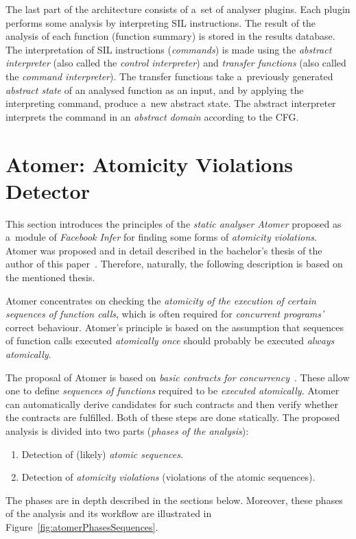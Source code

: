 \documentclass{ExcelAtFIT}
\theoremstyle{definition}
\begin{document}
The last part of the architecture consists of a~set of analyser plugins. Each plugin performs some analysis by interpreting SIL instructions. The result of the analysis of each function (function summary) is stored in the results database. The interpretation of SIL instructions (\emph{commands}) is made using the \emph{abstract interpreter} (also called the \emph{control interpreter}) and \emph{transfer functions} (also called the \emph{command interpreter}). The transfer functions take a~previously generated \emph{abstract state} of an analysed function as an input, and by applying the interpreting command, produce a~new abstract state. The abstract interpreter interprets the command in an \emph{abstract domain} according to the CFG.


\section{\hspace{-.15em}Atomer: Atomicity Violations Detector}
\label{sec:atomer}

This section introduces the principles of the \emph{static analyser Atomer} proposed as a~module of \emph{Facebook Infer} for finding some forms of \emph{atomicity violations}. Atomer was proposed and in detail described in the bachelor's thesis of the author of this paper~\cite{harmimBP}. Therefore, naturally, the following description is based on the mentioned thesis.

Atomer concentrates on checking the \emph{atomicity of the execution of certain sequences of function calls}, which is often required for \emph{concurrent programs'} correct behaviour. Atomer's principle is based on the assumption that sequences of function calls executed \emph{atomically once} should probably be executed \emph{always atomically}.

The proposal of Atomer is based on \emph{basic contracts for concurrency}~\cite{harmimBP, contracts2017}. These allow one to define \emph{sequences of functions} required to be \emph{executed atomically}. Atomer can automatically derive candidates for such contracts and then verify whether the contracts are fulfilled. Both of these steps are done statically. The proposed analysis is divided into two parts (\emph{phases of the analysis}):
\begin{enumerate}[label={\textbf{Phase~\arabic*}:}, leftmargin=4.2em]
    \item Detection of (likely) \emph{atomic sequences}.

    \item Detection of \emph{atomicity violations} (violations of the atomic sequences).
\end{enumerate}
The phases are in depth described in the sections below. Moreover, these phases of the analysis and its workflow are illustrated in Figure~\ref{fig:atomerPhasesSequences}.
\end{document}
